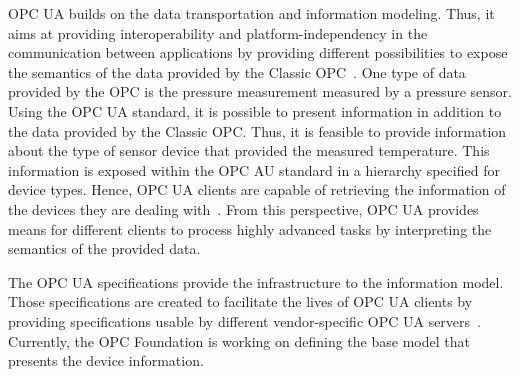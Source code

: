OPC UA builds on the data transportation and information modeling. Thus, it aims at providing interoperability and platform-independency in the communication between applications by providing different possibilities to expose the semantics of the data provided by the Classic OPC~\cite{bookua}. One type of data provided by the OPC is the pressure measurement measured by a pressure sensor. Using the OPC UA standard, it is possible to present information in addition to the data provided by the Classic OPC. Thus, it is feasible to provide information about the type of sensor device that provided the measured temperature. This information is exposed within the OPC AU standard in a hierarchy specified for device types. Hence, OPC UA clients are capable of retrieving the information of the devices they are dealing with~\cite{bookua}. From this perspective, OPC UA provides means for different clients to process highly advanced tasks by interpreting the semantics of the provided data. \par
The OPC UA specifications provide the infrastructure to the information model. Those specifications are created to facilitate the lives of OPC UA clients by providing specifications usable by different vendor-specific OPC UA servers~\cite{bookua}. Currently, the OPC Foundation is working on defining the base model that presents the device information.\par

